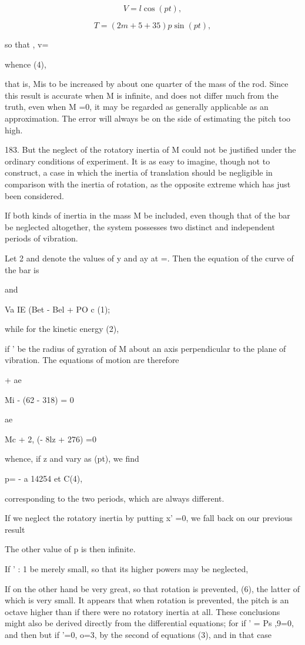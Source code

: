 \[V = l \cos(pt),\]



\[T = (2m + 5 +35) p \sin(pt),\]

so that , v=

whence (4),

that is, Mis to be increased by about one quarter of the mass of the
rod. Since this result is accurate when M is infinite, and does not
differ much from the truth, even when M =0, it may be regarded as
generally applicable as an approximation. The error will always be on
the side of estimating the pitch too high.

183. But the neglect of the rotatory inertia of M could not be justified
under the ordinary conditions of experiment. It is as easy to imagine,
though not to construct, a case in which the inertia of translation
should be negligible in comparison with the inertia of
rotation, as the opposite extreme which has just been considered.

If both kinds of inertia in the mass M be included, even though that of
the bar be neglected altogether, the system possesses two distinct and
independent periods of vibration.

Let 2 and denote the values of y and ay at =. Then the equation of the
curve of the bar is

and

Va IE (Bet - Bel + PO c (1);

while for the kinetic energy (2),

if ' be the radius of gyration of M about an axis perpendicular to the
plane of vibration. The equations of motion are therefore

+ ae

Mi - (62 - 318) = 0

ae

Mc + 2, (- 8lz + 276) =0

whence, if z and vary as (pt), we find

p= - a 14254 et C(4),

corresponding to the two periods, which are always different.

If we neglect the rotatory inertia by putting x' =0, we fall back on our
previous result

The other value of p is then infinite.

If ' : 1 be merely small, so that its higher powers may be neglected,


If on the other hand be very great, so that rotation is prevented,
(6),
the latter of which is very small. It appears that when rotation is
prevented, the pitch is an octave higher than if there were no rotatory
inertia at all. These conclusions might also be derived
directly from the differential equations; for if ' = Ps ,9=0, and then
but if '=0, o=3, by the second of equations (3), and in that case


